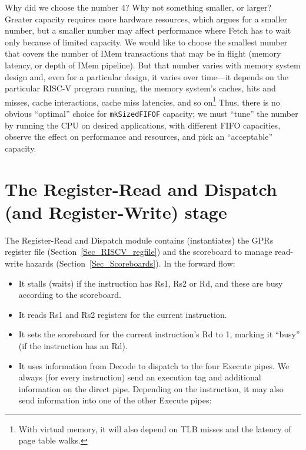 Why did we choose the number 4?  Why not something smaller, or larger?
Greater capacity requires more hardware resources, which argues for a
smaller number, but a smaller number may affect performance where
Fetch has to wait only because of limited capacity.  We would like to
choose the smallest number that covers the number of IMem transactions
that may be in flight (memory latency, or depth of IMem pipeline).
But that number varies with memory system design and, even for a
particular design, it varies over time---it depends on the particular
RISC-V program running, the memory system's caches, hits and misses,
cache interactions, cache miss latencies, and so on\footnote{With
virtual memory, it will also depend on TLB misses and the latency of
page table walks.}  Thus, there is no obvious ``optimal'' choice for
\verb|mkSizedFIFOF| capacity; we must ``tune'' the number by running
the CPU on desired applications, with different FIFO capacities,
observe the effect on performance and resources, and pick an
``acceptable'' capacity.


\section{The Register-Read and Dispatch (and Register-Write) stage}

\label{Sec_Fife_RR_RW_stage}

The Register-Read and Dispatch module contains (instantiates) the GPRs
register file (Section~\ref{Sec_RISCV_regfile}) and the scoreboard to
manage read-write hazards (Section~\ref{Sec_Scoreboards}).  In the
forward flow:

\begin{itemize}

  \item It stalls (waits) if the instruction has Rs1, Rs2 or Rd, and
        these are busy according to the scoreboard.

  \item It reads Rs1 and Rs2 registers for the current instruction.

  \item It sets the scoreboard for the current instruction's Rd to 1,
        marking it ``busy'' (if the instruction has an Rd).

  \item It uses information from Decode to dispatch to the four
        Execute pipes.  We always (for every instruction) send an
        execution tag and additional information on the direct pipe.
        Depending on the instruction, it may also send information
        into one of the other Execute pipes:


\end{itemize}

